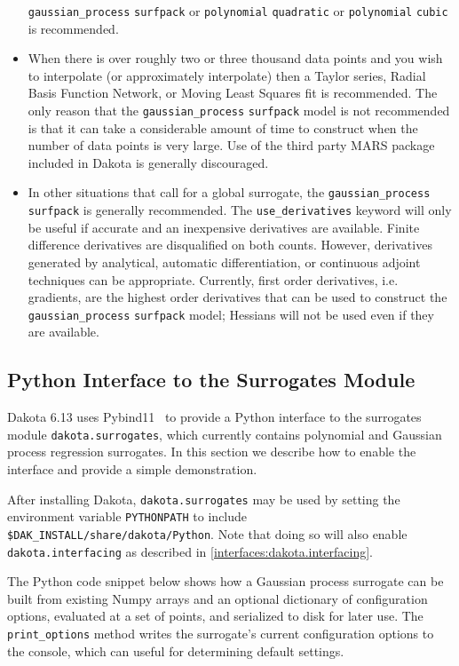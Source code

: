\begin{itemize}
      \texttt{gaussian\_process} \texttt{surfpack} or 
      \texttt{polynomial} \texttt{quadratic} or 
      \texttt{polynomial} \texttt{cubic} is recommended.
\item When there is over roughly two or three thousand data points 
      and you wish to interpolate (or approximately interpolate) then 
      a Taylor series, Radial Basis Function Network, or Moving Least
      Squares fit is recommended.  The only reason that the 
      \texttt{gaussian\_process} \texttt{surfpack} model is not 
      recommended is that it can take a considerable amount of time
      to construct when the number of data points is very large.  Use 
      of the third party MARS package included in Dakota is generally 
      discouraged.
\item In other situations that call for a global surrogate, the 
      \texttt{gaussian\_process} \texttt{surfpack} is generally 
      recommended.  The \texttt{use\_derivatives} keyword will 
      only be useful if accurate and an inexpensive derivatives 
      are available. Finite difference derivatives are disqualified 
      on both counts.  However, derivatives generated by analytical,
      automatic differentiation, or continuous adjoint techniques
      can be appropriate.  Currently, first order derivatives, i.e.
      gradients, are the highest order derivatives that can be used
      to construct the \texttt{gaussian\_process} \texttt{surfpack}
      model; Hessians will not be used even if they are available.
\end{itemize}

\subsection{Python Interface to the Surrogates Module}
\label{models:surrogate:python}

Dakota 6.13 uses Pybind11~\cite{pybind11} to provide a Python interface to the
surrogates module \texttt{dakota.surrogates}, which currently contains
polynomial and Gaussian process regression surrogates. In this section we
describe how to enable the interface and provide a simple demonstration.

After installing Dakota, \texttt{dakota.surrogates} may be used by setting the
environment variable \texttt{PYTHONPATH} to include
\texttt{\$DAK\_INSTALL/share/dakota/Python}. Note that doing so will also
enable \texttt{dakota.interfacing} as described in
\ref{interfaces:dakota.interfacing}.

The Python code snippet below shows how a Gaussian process surrogate can be
built from existing Numpy arrays and an optional dictionary of configuration options,
evaluated at a set of points, and serialized to disk for later use. The
\texttt{print\_options} method writes the surrogate's current configuration
options to the console, which can useful for determining default settings.


